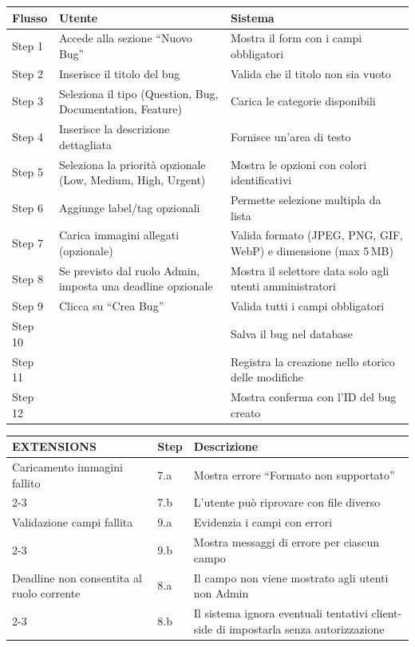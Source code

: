 ﻿\documentclass[a4paper,11pt]{article}
\begin{document}
\begin{tabular}{|p{2cm}|p{5.5cm}|p{6.5cm}|}
\hline
\textbf{Flusso} & \textbf{Utente} & \textbf{Sistema} \\
\hline
Step 1 & Accede alla sezione ``Nuovo Bug'' & Mostra il form con i campi obbligatori \\
\hline
Step 2 & Inserisce il titolo del bug & Valida che il titolo non sia vuoto \\
\hline
Step 3 & Seleziona il tipo (Question, Bug, Documentation, Feature) & Carica le categorie disponibili \\
\hline
Step 4 & Inserisce la descrizione dettagliata & Fornisce un'area di testo \\
\hline
Step 5 & Seleziona la priorit\`a opzionale (Low, Medium, High, Urgent) & Mostra le opzioni con colori identificativi \\
\hline
Step 6 & Aggiunge label/tag opzionali & Permette selezione multipla da lista \\
\hline
Step 7 & Carica immagini allegati (opzionale) & Valida formato (JPEG, PNG, GIF, WebP) e dimensione (max 5\,MB) \\
\hline
Step 8 & Se previsto dal ruolo Admin, imposta una deadline opzionale & Mostra il selettore data solo agli utenti amministratori \\
\hline
Step 9 & Clicca su ``Crea Bug'' & Valida tutti i campi obbligatori \\
\hline
Step 10 & & Salva il bug nel database \\
\hline
Step 11 & & Registra la creazione nello storico delle modifiche \\
\hline
Step 12 & & Mostra conferma con l'ID del bug creato \\
\hline
\end{tabular}

\vspace{0.5cm}

\begin{tabular}{|p{3cm}|p{1.5cm}|p{9.5cm}|}
\hline
\textbf{EXTENSIONS} & \textbf{Step} & \textbf{Descrizione} \\
\hline
Caricamento immagini fallito & 7.a & Mostra errore ``Formato non supportato'' \\
\cline{2-3}
 & 7.b & L'utente pu\`o riprovare con file diverso \\
\hline
Validazione campi fallita & 9.a & Evidenzia i campi con errori \\
\cline{2-3}
 & 9.b & Mostra messaggi di errore per ciascun campo \\
\hline
Deadline non consentita al ruolo corrente & 8.a & Il campo non viene mostrato agli utenti non Admin \\
\cline{2-3}
 & 8.b & Il sistema ignora eventuali tentativi client-side di impostarla senza autorizzazione \\
\hline
\end{tabular}
\end{document}

